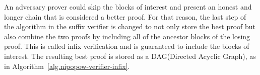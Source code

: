 



An adversary prover could skip the blocks of interest and present an honest and
longer chain that is considered a better proof. For that reason, the last step
of the algorithm in the suffix verifier is changed to not only store the best
proof but also combine the two proofs by including all of the ancestor blocks
of the losing proof. This is called infix verification and is guaranteed to
include the blocks of interest. The resulting best proof is stored as a
DAG(Directed Acyclic Graph), as in Algorithm~\ref{alg.nipopow-verifier-infix}.


